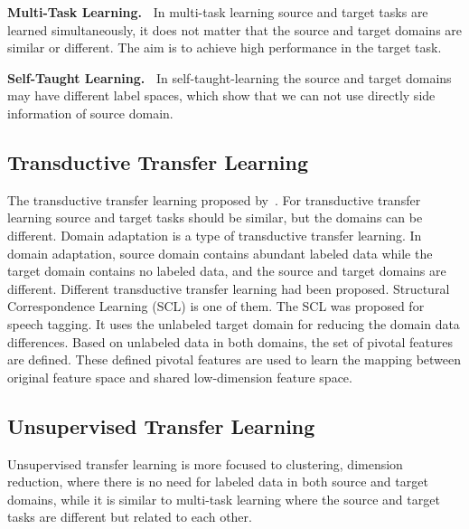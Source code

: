 \noindent
\textbf{Multi-Task Learning.~}
In multi-task learning source and target tasks are learned simultaneously, it does not matter that the source and target domains are similar or different. The aim is to achieve high performance in the target task.%

\noindent
\textbf{Self-Taught Learning.~}
In self-taught-learning the source and target domains may have different label spaces, which show that we can not use directly side information of source domain.

\subsection{Transductive Transfer Learning}
The transductive transfer learning proposed by~\cite{arnold2007comparative}. For transductive transfer learning source and target tasks should be similar, but the domains can be different. Domain adaptation is a type of transductive transfer learning. In domain adaptation, source domain contains abundant labeled data while the target domain contains no labeled data, and the source and target domains are different. Different transductive transfer learning had been proposed. Structural Correspondence Learning (SCL) is one of them. The SCL was proposed for speech tagging. It uses the unlabeled target domain for reducing the domain data differences. Based on unlabeled data in both domains, the set of pivotal features are defined. These defined pivotal features are used to learn the mapping between original feature space and shared low-dimension feature space.
\subsection{Unsupervised Transfer Learning}
Unsupervised transfer learning is more focused to clustering, dimension reduction, where there is no need for labeled data in both source and target domains, while it is similar to multi-task learning where the source and target tasks are different but related to each other.\\

